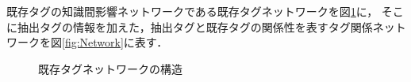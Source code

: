 既存タグの知識間影響ネットワークである既存タグネットワークを図\ref{fig:SimpleNetwork}に，
そこに抽出タグの情報を加えた，抽出タグと既存タグの関係性を表すタグ関係ネットワークを図\ref{fig:Network}に表す．


\begin{figure}[H]
\begin{center}
\hspace*{-20pt}
\end{center}
\caption{既存タグネットワークの構造}
\label{fig:SimpleNetwork}
\end{figure}

